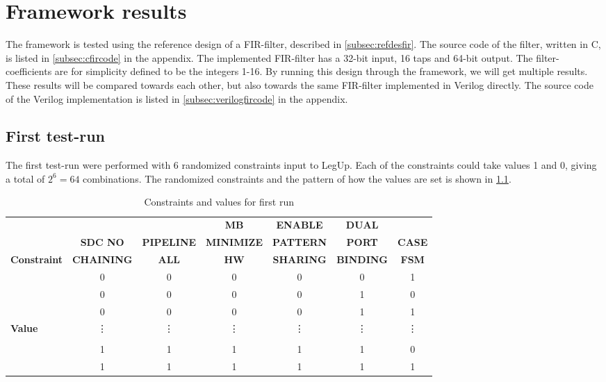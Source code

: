 \chapter{Framework results}
The framework is tested using the reference design of a FIR-filter, described in \cref{subsec:refdesfir}. The source code of the filter, written in C, is listed in \cref{subsec:cfircode} in the appendix. The implemented FIR-filter has a 32-bit input, 16 taps and 64-bit output. The filter-coefficients are for simplicity defined to be the integers 1-16. By running this design through the framework, we will get multiple results. These results will be compared towards each other, but also towards the same FIR-filter implemented in Verilog directly. The source code of the Verilog implementation is listed in \cref{subsec:verilogfircode} in the appendix.

\section{\label{sec:firstrun}First test-run}
The first test-run were performed with 6 randomized constraints input to LegUp. Each of the constraints could take values 1 and 0, giving a total of $2^6=64$ combinations. The randomized constraints and the pattern of how the values are set is shown in \cref{tab:randomconstraint}.

\begin{table}
\tiny
    \begin{center}
    \begin{tabular}{l|cccccc}
     & & & \textbf{MB} & \textbf{ENABLE} & \textbf{DUAL} & \\
          &
          \textbf{SDC NO} & 
          \textbf{PIPELINE} & 
          \textbf{MINIMIZE} & 
          \textbf{PATTERN} & 
          \textbf{PORT} &
          \textbf{CASE} \\
        \textbf{Constraint}
           & \textbf{CHAINING}
           & \textbf{ALL}
           & \textbf{HW}
           & \textbf{SHARING}
           & \textbf{BINDING}
           & \textbf{FSM}
    \\ \midrule
    & 0 & 0 & 0 & 0 & 0 & 1 \\
    & 0 & 0 & 0 & 0 & 1 & 0 \\
    & 0 & 0 & 0 & 0 & 1 & 1 \\
    \textbf{Value} & \vdots & \vdots & \vdots & \vdots & \vdots & \vdots \\
    & &  &  &  &  &  \\
    & 1 & 1 & 1 & 1 & 1 & 0 \\
    & 1 & 1 & 1 & 1 & 1 & 1
    \\ \bottomrule
    \end{tabular}
    \caption{\label{tab:randomconstraint}Constraints and values for first run}
    \end{center}
\end{table}

